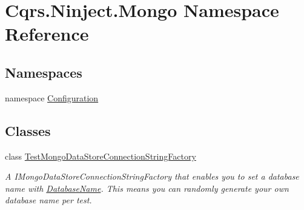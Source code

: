 \hypertarget{namespaceCqrs_1_1Ninject_1_1Mongo}{}\section{Cqrs.\+Ninject.\+Mongo Namespace Reference}
\label{namespaceCqrs_1_1Ninject_1_1Mongo}
\subsection*{Namespaces}
\begin{DoxyCompactItemize}
\item 
namespace \hyperlink{namespaceCqrs_1_1Ninject_1_1Mongo_1_1Configuration}{Configuration}
\end{DoxyCompactItemize}
\subsection*{Classes}
\begin{DoxyCompactItemize}
\item 
class \hyperlink{classCqrs_1_1Ninject_1_1Mongo_1_1TestMongoDataStoreConnectionStringFactory}{Test\+Mongo\+Data\+Store\+Connection\+String\+Factory}
\begin{DoxyCompactList}\small\item\em A I\+Mongo\+Data\+Store\+Connection\+String\+Factory that enables you to set a database name with \hyperlink{classCqrs_1_1Ninject_1_1Mongo_1_1TestMongoDataStoreConnectionStringFactory_a911d570725e6702a9c1d16321202d89f_a911d570725e6702a9c1d16321202d89f}{Database\+Name}. This means you can randomly generate your own database name per test. \end{DoxyCompactList}\end{DoxyCompactItemize}
